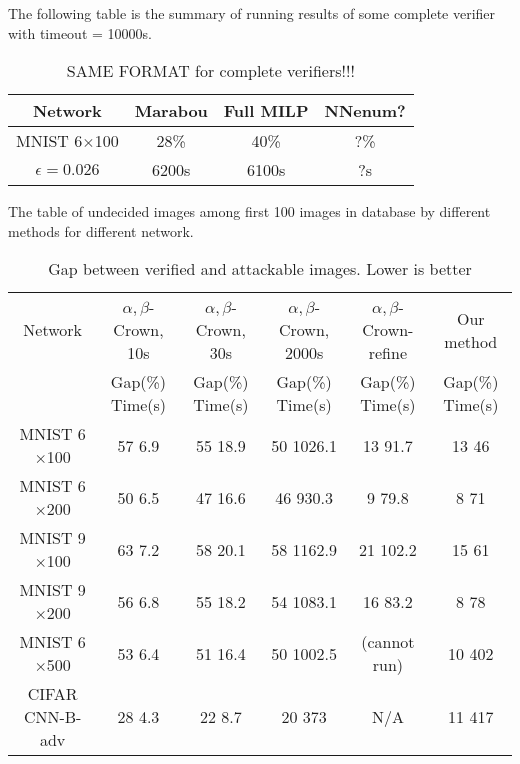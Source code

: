 \vspace*{4ex}


The following table is the summary of running results of some complete verifier with timeout = 10000s. 

\begin{table}
	\centering
	\caption{SAME FORMAT for complete verifiers!!!}
	\label{table_complete}
	\begin{tabular}{||c||c|c|c||}
		\hline
		Network &  Marabou  & Full MILP & NNenum? \\ \hline
		MNIST 6$\times$100 & 28\% & 40\% & ?\%   \\ \hline
		$\epsilon = 0.026$ & 6200s & 6100s
		&  ?s  \\  \hline
	\end{tabular}
\end{table}


\vspace*{4ex}

The table of undecided images among first 100 images in database by different methods for different network.


\begin{table}
	\centering
	\caption{Gap between verified and attackable images. Lower is better}
	\label{table_undecided}
	\begin{tabular}{|c|c|c|c|c|c|}
		\hline
		Network & $\alpha,\beta$-Crown, 10s & $\alpha,\beta$-Crown, 30s & $\alpha,\beta$-Crown, 2000s & $\alpha,\beta$-Crown-refine & Our method \\ 
		& Gap(\%) \hfill Time(s) & Gap(\%) \hfill Time(s) & Gap(\%) \hfill Time(s) & Gap(\%) \hfill Time(s) & Gap(\%) \hfill Time(s)\\ \hline
		MNIST 6$\times$100 & 57 \hfill 6.9 & 55 \hfill 18.9 & 50 \hfill 1026.1 & 13 \hfill 91.7 & 13 \hfill 46 \\ \hline
		MNIST 6$\times$200 & 50 \hfill 6.5 & 47 \hfill 16.6 & 46 \hfill 930.3 & 9 \hfill 79.8 & 8 \hfill 71 \\ \hline
		MNIST 9$\times$100 & 63 \hfill 7.2 & 58 \hfill 20.1 & 58 \hfill 1162.9 & 21 \hfill 102.2 & 15 \hfill 61 \\ \hline
		MNIST 9$\times$200 & 56 \hfill 6.8 & 55 \hfill 18.2 & 54 \hfill 1083.1 & 16 \hfill 83.2 & 8 \hfill 78 \\ \hline
		MNIST 6$\times$500 & 53 \hfill 6.4 & 51 \hfill 16.4 & 50 \hfill 1002.5 & (cannot run) & 10 \hfill 402 \\ \hline
		CIFAR CNN-B-adv & 28 \hfill 4.3 & 22 \hfill 8.7 & 20 \hfill 373 & N/A & 11 \hfill 417 \\ \hline
	\end{tabular}
\end{table}